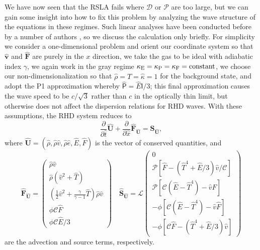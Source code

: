 \documentclass[preprint,12pt,authoryear]{elsarticle}
\newcommand{\tenI}{\mathsf{I}}
\newcommand{\hatt}{\hat{t}}
\newcommand{\hrho}{\hat{\rho}}
\newcommand{\he}{\hat{e}}
\newcommand{\hE}{\hat{E}}
\newcommand{\hv}{\hat{v}}
\newcommand{\hF}{\hat{F}}
\newcommand{\hx}{\hat{x}}
\newcommand{\hT}{\hat{T}}
\newcommand{\hvecv}{\hat{\mathbf{v}}}
\newcommand{\hvecF}{\hat{\mathbf{F}}}
\newcommand{\htenP}{\hat{\mathsf{P}}}
\newcommand{\hvecFU}{\hat{\mathbf{F}}_{\hat{\mathbf{U}}}}
\newcommand{\hvecU}{{\hat{\mathbf{U}}}}
\newcommand{\hvecS}{\hat{\mathbf{S}}}
\newcommand{\calC}{\mathcal{C}}
\newcommand{\calP}{\mathcal{P}}
\newcommand{\calL}{\mathcal{L}}
\begin{document}
We have now seen that the RSLA fails where $\mathcal{D}$ or $\mathcal{P}$ are too large, but we can gain some insight into how to fix this problem by analyzing the wave structure of the equations in these regimes. Such linear analyses have been conducted before by a number of authors \citep[e.g.,][]{Mihalas83a, Bogdan96a, Lowrie99a, Mihalas99a, Skinner13a}, so we discuss the calculation only briefly. For simplicity we consider a one-dimensional problem and orient our coordinate system so that $\hvecv$ and $\hvecF$ are purely in the $x$ direction, we take the gas to be ideal with adiabatic index $\gamma$, we again work in the gray regime $\kappa_{\rm E} = \kappa_{\rm P} = \kappa_{\rm F} = \mathrm{constant}$, we choose our non-dimensionalization so that $\hrho = \hT =  \hat{\kappa} = 1$ for the background state, and adopt the P1 approximation whereby $\htenP = \hE \tenI / 3$; this final approximation causes the wave speed to be $c/\sqrt{3}$ rather than $c$ in the optically thin limit, but otherwise does not affect the dispersion relations for RHD waves. With these assumptions, the RHD system reduces to
\begin{equation}
\frac{\partial}{\partial\hatt} \hvecU + \frac{\partial}{\partial\hx} \hvecFU = \hvecS_{\hvecU},
\label{eq:rhd_reduced}
\end{equation}
where $\hvecU = (\hrho, \hrho\hv, \hrho\he, \hE, \hF)$ is the vector of conserved quantities, and
\begin{equation}
\hvecFU =
\left(
\begin{array}{c}
\hrho\hv \\
\hrho\left(\hv^2 + \hT\right) \\
\left(\frac{1}{2}\hv^2+\frac{\gamma}{\gamma-1}\hT\right) \hrho\hv \\
\phi \calC \hF \\
\phi \calC \hE/3
\end{array}
\right)
\quad
\hvecS_{\hvecU} = \calL\left(
\begin{array}{c}
0 \\
\calP\left[\hF - \left(\hT^4 + \hE/3\right)\hv/\calC \right] \\
\calP \left[\calC\left(\hE-\hT^4\right) - \hv\hF \right] \\
-\phi \left[\calC\left(\hE-\hT^4\right) - \hv\hF \right] \\
-\phi \left[\calC \hF - (\hT^4+\hE/3)\hv\right]
\end{array}
\right)
\label{eq:flux_and_source}
\end{equation}
are the advection and source terms, respectively.
\end{document}
